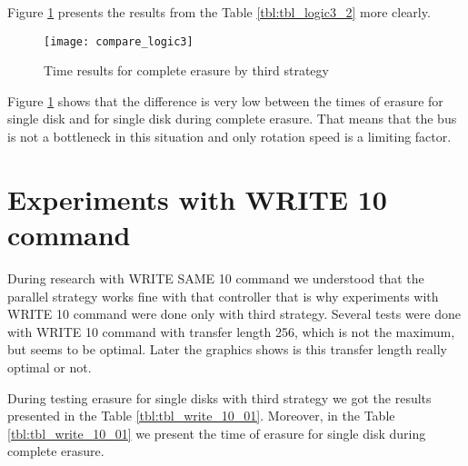 \newpage
Figure \ref{fig:compare_logic3} presents the results from the Table \ref{tbl:tbl_logic3_2} more clearly.

\begin{figure}[h!]
\begin{center}
  \texttt{[image: compare\_logic3]}
\end{center}
  \caption{Time results for complete erasure by third strategy}
  \label{fig:compare_logic3}
\end{figure}

Figure \ref{fig:compare_logic3} shows that the difference is very low between the times of erasure for single disk and for single disk during complete erasure. That means that the bus is not a bottleneck in this situation and only rotation speed is a limiting factor.




\section{Experiments with WRITE 10 command}

During research with WRITE SAME 10 command we understood that the parallel strategy works fine with that
controller that is why experiments with WRITE 10 command were done only with third strategy. Several tests were done with WRITE 10 command with transfer length 256, which is not the maximum, but seems to be optimal. Later the graphics shows is this transfer length really optimal or not.

\newpage
During testing erasure for single disks with third strategy we got the results presented in the Table \ref{tbl:tbl_write_10_01}. Moreover, in the Table \ref{tbl:tbl_write_10_01} we present the time of erasure for single disk during complete erasure. 

